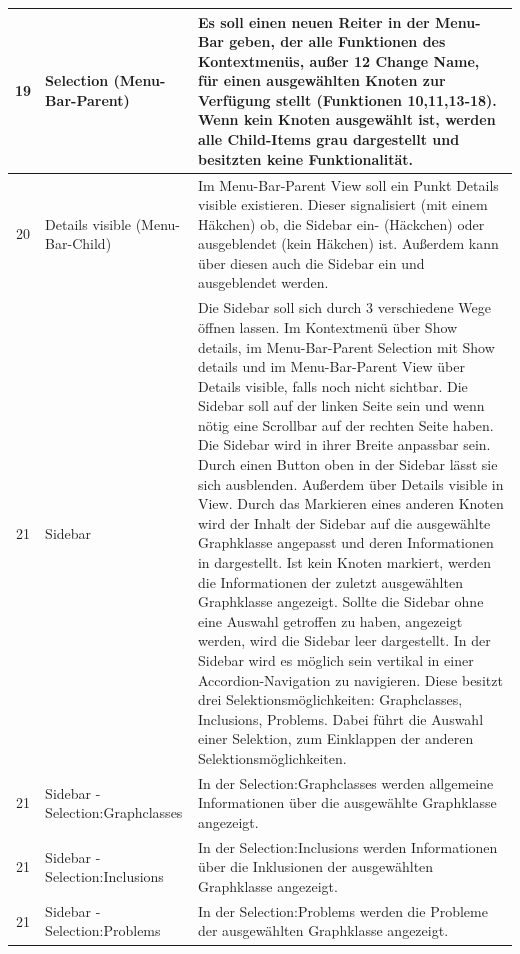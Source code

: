 \documentclass[11pt,a4paper]{article}
\begin{document}
\begin{tabular}{|c|p{5cm}|p{10cm}|}
\hline 
19 & Selection (Menu-Bar-Parent) & Es soll einen neuen Reiter in der Menu-Bar geben, der alle Funktionen des Kontextmenüs, außer 12 Change Name, für einen ausgewählten Knoten zur Verfügung stellt (Funktionen 10,11,13-18). Wenn kein Knoten ausgewählt ist, werden alle Child-Items grau dargestellt und besitzten keine Funktionalität.  \\
\hline
20 & Details visible (Menu-Bar-Child) & Im Menu-Bar-Parent View soll ein Punkt Details visible existieren. Dieser signalisiert (mit einem Häkchen) ob, die Sidebar ein- (Häckchen) oder ausgeblendet (kein Häkchen) ist. Außerdem kann über diesen auch die Sidebar ein und ausgeblendet werden.\\ 
\hline
21 & Sidebar & Die Sidebar soll sich durch 3 verschiedene Wege öffnen lassen. Im Kontextmenü über Show details, im Menu-Bar-Parent Selection mit Show details und im Menu-Bar-Parent View über Details visible, falls noch nicht sichtbar. Die Sidebar soll auf der linken Seite sein und wenn nötig eine Scrollbar auf der rechten Seite haben. Die Sidebar wird in ihrer Breite anpassbar sein. Durch einen Button oben in der Sidebar lässt sie sich ausblenden. Außerdem über Details visible in View. Durch das Markieren eines anderen Knoten wird der Inhalt der Sidebar auf die ausgewählte Graphklasse angepasst und deren Informationen in dargestellt. Ist kein Knoten markiert, werden die Informationen der zuletzt ausgewählten Graphklasse angezeigt. Sollte die Sidebar ohne eine Auswahl getroffen zu haben, angezeigt werden, wird die Sidebar leer dargestellt. In der Sidebar wird es möglich sein vertikal in einer Accordion-Navigation zu navigieren. Diese besitzt drei Selektionsmöglichkeiten: Graphclasses, Inclusions, Problems. Dabei führt die Auswahl einer Selektion, zum Einklappen der anderen Selektionsmöglichkeiten. \\
\hline
21 & Sidebar - Selection:Graphclasses  & In der Selection:Graphclasses werden allgemeine Informationen über die ausgewählte Graphklasse angezeigt. \\
\hline
21 & Sidebar - Selection:Inclusions & In der Selection:Inclusions werden Informationen über die Inklusionen der ausgewählten Graphklasse angezeigt. \\
\hline
21 & Sidebar - Selection:Problems & In der Selection:Problems werden die Probleme der ausgewählten Graphklasse angezeigt. \\
\hline
\end{tabular} \newpage
\end{document}
